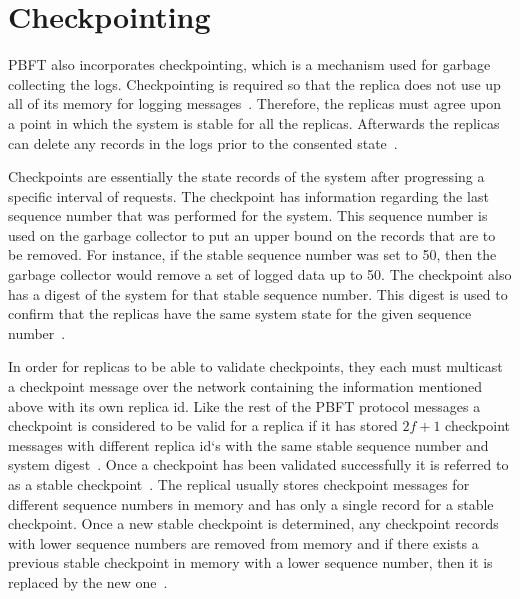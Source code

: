 \section{Checkpointing}
\label{sec:checkpoint}
PBFT also incorporates checkpointing, which is a mechanism used for garbage collecting the logs. Checkpointing is required so that the replica does not use up all of its memory for logging messages~\cite[p.~261]{BOOK:BuildDepDistSyst}. Therefore, the replicas must agree upon a point in which the system is stable for all the replicas. Afterwards the replicas can delete any records in the logs prior to the consented state~\cites[p.~5]{PAPER:OGPBFT}[p.~410]{PAPER:PBFTRecovery}.

Checkpoints are essentially the state records of the system after progressing a specific interval of requests. The checkpoint has information regarding the last sequence number that was performed for the system. This sequence number is used on the garbage collector to put an upper bound on the records that are to be removed. For instance, if the stable sequence number was set to 50, then the garbage collector would remove a set of logged data up to 50. The checkpoint also has a digest of the system for that stable sequence number. This digest is used to confirm that the replicas have the same system state for the given sequence number~\cites[p.~5]{PAPER:OGPBFT}[p.~410]{PAPER:PBFTRecovery}.

In order for replicas to be able to validate checkpoints, they each must multicast a checkpoint message over the network containing the information mentioned above with its own replica id. Like the rest of the PBFT protocol messages a checkpoint is considered to be valid for a replica if it has stored $2f+1$ checkpoint messages with different replica id`s with the same stable sequence number and system digest~\cites[p.~261-262]{BOOK:BuildDepDistSyst}[p.~5]{PAPER:OGPBFT}[p.~410]{PAPER:PBFTRecovery}. Once a checkpoint has been validated successfully it is referred to as a stable checkpoint~\cites[p.~3]{PAPER:DPBFT}[p.~261]{BOOK:BuildDepDistSyst}. The replical usually stores checkpoint messages for different sequence numbers in memory and has only a single record for a stable checkpoint. Once a new stable checkpoint is determined, any checkpoint records with lower sequence numbers are removed from memory and if there exists a previous stable checkpoint in memory with a lower sequence number, then it is replaced by  the new one~\cite[p.~261-262]{BOOK:BuildDepDistSyst}.

